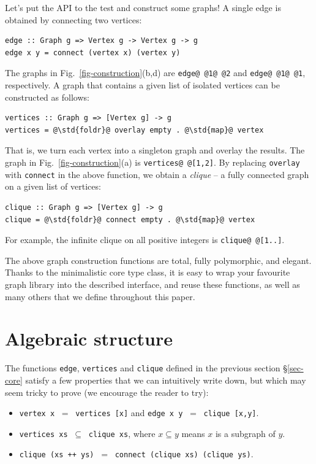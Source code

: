 \documentclass[acmlarge,anonymous]{acmart}\settopmatter{printfolios=true}
\newcommand{\hs}{\texttt}
\newcommand{\std}[1]{{\color[rgb]{0,0.3,0} #1}}
\begin{document}
Let's put the API to the test and construct some graphs! A single edge is
obtained by connecting two vertices:

\begin{verbatim}
edge :: Graph g => Vertex g -> Vertex g -> g
edge x y = connect (vertex x) (vertex y)
\end{verbatim}

\noindent
The graphs in Fig.~\ref{fig-construction}(b,d) are \hs{edge@\,@1@\,@2} and
\hs{edge@\,@1@\,@1}, respectively.
A graph that contains a given list of isolated vertices can be constructed
as follows:

\begin{verbatim}
vertices :: Graph g => [Vertex g] -> g
vertices = @\std{foldr}@ overlay empty . @\std{map}@ vertex
\end{verbatim}

\noindent
That is, we turn each vertex into a singleton graph and overlay the results.
The graph in Fig.~\ref{fig-construction}(a) is \hs{vertices@\,@[1,2]}.
By replacing \hs{overlay} with \hs{connect} in the above
function, we obtain a \emph{clique} -- a fully connected graph on a given list
of vertices:

\begin{verbatim}
clique :: Graph g => [Vertex g] -> g
clique = @\std{foldr}@ connect empty . @\std{map}@ vertex
\end{verbatim}

\noindent
For example, the infinite clique on all positive integers is \hs{clique@\,@[1..]}.

The above graph construction functions are total, fully polymorphic, and elegant.
Thanks to the minimalistic core type class, it is easy to wrap your favourite
graph library into the described interface, and reuse these functions, as well
as many others that we define throughout this paper.

\section{Algebraic structure}\label{sec-algebra}

The functions \hs{edge}, \hs{vertices} and \hs{clique} defined in the previous
section \S\ref{sec-core} satisfy a few properties that we can intuitively write down,
but which may seem tricky to prove (we encourage the reader to try):
\begin{itemize}
    \item \hs{vertex x} $\ =\ $ \hs{vertices [x]} and \hs{edge x y} $\ =\ $ \hs{clique [x,y]}.
    \item \hs{vertices xs} $\ \subseteq\ $ \hs{clique xs}, where $x \subseteq y$ means
    $x$ is a subgraph of $y$.
    \item \hs{clique (xs ++ ys)} $\ =\ $ \hs{connect (}\hs{clique xs) (}\hs{clique ys)}.
\end{itemize}
\end{document}
